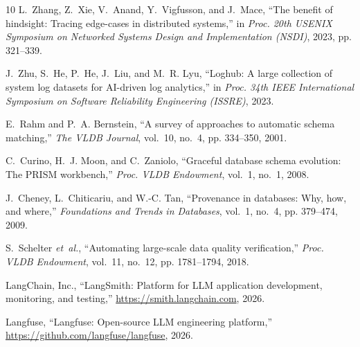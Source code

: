 \documentclass[conference]{IEEEtran}
\begin{document}
\begin{thebibliography}{10}
L.~Zhang, Z.~Xie, V.~Anand, Y.~Vigfusson, and J.~Mace, ``The benefit of
  hindsight: Tracing edge-cases in distributed systems,'' in \emph{Proc. 20th
  USENIX Symposium on Networked Systems Design and Implementation (NSDI)},
  2023, pp. 321--339.

J.~Zhu, S.~He, P.~He, J.~Liu, and M.~R. Lyu, ``Loghub: A large collection of
  system log datasets for {AI}-driven log analytics,'' in \emph{Proc. 34th
  IEEE International Symposium on Software Reliability Engineering (ISSRE)},
  2023.

E.~Rahm and P.~A. Bernstein, ``A survey of approaches to automatic schema
  matching,'' \emph{The VLDB Journal}, vol.~10, no.~4, pp. 334--350, 2001.

C.~Curino, H.~J. Moon, and C.~Zaniolo, ``Graceful database schema evolution:
  The {PRISM} workbench,'' \emph{Proc. VLDB Endowment}, vol.~1, no.~1, 2008.

J.~Cheney, L.~Chiticariu, and W.-C. Tan, ``Provenance in databases: Why, how,
  and where,'' \emph{Foundations and Trends in Databases}, vol.~1, no.~4, pp.
  379--474, 2009.

S.~Schelter \emph{et~al.}, ``Automating large-scale data quality
  verification,'' \emph{Proc. VLDB Endowment}, vol.~11, no.~12, pp.
  1781--1794, 2018.

{LangChain, Inc.}, ``{LangSmith}: Platform for {LLM} application development,
  monitoring, and testing,'' \url{https://smith.langchain.com}, 2026.

{Langfuse}, ``{Langfuse}: Open-source {LLM} engineering platform,''
  \url{https://github.com/langfuse/langfuse}, 2026.

\end{thebibliography}
\end{document}
